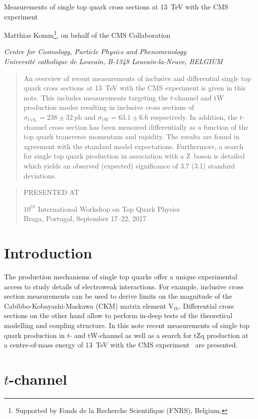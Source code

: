 \documentclass[12pt]{article}
\newcommand\pubnumber{}
\newcommand\pubdate{\today}
\def\institute{Centre for Cosmology, Particle Physics and Phenomenology\\
Universit\'e catholique de Louvain, B-1348 Louvain-la-Neuve, BELGIUM}
\def\support{\footnote{Supported by Fonds de la Recherche Scientifique (FNRS), Belgium.}}
\def\Title#1{\begin{center} {\Large #1 } \end{center}}
\def\Author#1{\begin{center}{ \sc #1} \end{center}}
\def\Address#1{\begin{center}{ \it #1} \end{center}}
\newcommand\pubblock{\rightline{\begin{tabular}{l} \pubnumber\\
         \pubdate  \end{tabular}}}
\newenvironment{Abstract}{\begin{quotation}  }{\end{quotation}}
\newenvironment{Presented}{\begin{quotation} \begin{center} 
             PRESENTED AT\end{center}\bigskip 
      \begin{center}\begin{large}}{\end{large}\end{center} \end{quotation}}
\begin{document}
\begin{titlepage}
\pubblock

\vfill
\Title{Measurements of single top quark cross sections at 13~TeV with the CMS experiment}
\vfill
\Author{Matthias Komm\support, on behalf of the CMS Collaboration}
\Address{\institute}
\vfill
\begin{Abstract}
An overview of recent measurements of inclusive and differential single top quark cross sections at 13~TeV with the CMS experiment is given in this note. This includes measurements targeting the $t$-channel and tW production modes resulting in inclusive cross sections of $\sigma_{t\mathrm{\mbox{-}ch.}}=238\pm32~\mathrm{pb}$ and $\sigma_\mathrm{tW}=63.1\pm6.6$ respectively. In addition, the $t$-channel cross section has been measured differentially as a function of the top quark transverse momentum and rapidity. The results are found in agreement with the standard model expectations. Furthermore, a search for single top quark production in association with a Z~boson is detailed which yields an observed (expected) significance of 3.7 (3.1) standard deviations. 
\end{Abstract}
\vfill
\begin{Presented}
$10^{th}$ International Workshop on Top Quark Physics\\
Braga, Portugal,  September 17--22, 2017
\end{Presented}
\vfill
\end{titlepage}
\def\thefootnote{\fnsymbol{footnote}}
\setcounter{footnote}{0}
%

\section{Introduction}

The production mechanisms of single top quarks offer a unique experimental access to study details of electroweak interactions. For example, inclusive cross section measurements can be used to derive limits on the magnitude of the Cabibbo-Kobayashi-Maskawa (CKM) matrix element $\mathrm{V}_\mathrm{tb}$. Differential cross sections on the other hand allow to perform in-deep tests of the theoretical modelling and coupling structure. In this note recent measurements of single top quark production in $t$- and tW-channel as well as a search for tZq production at a centre-of-mass energy of 13~TeV with the CMS experiment~\cite{cms} are presented.


\section{$t$-channel}
\end{document}

